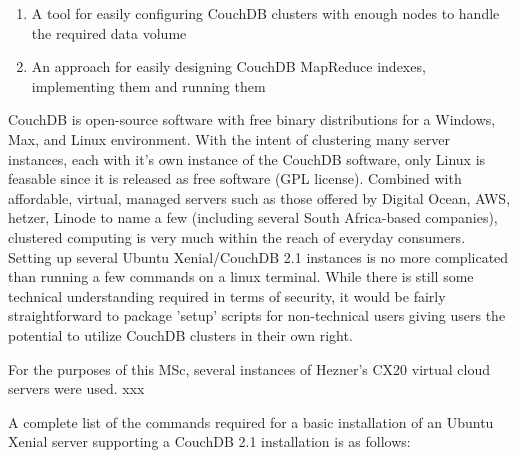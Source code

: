 \begin{enumerate}
    \item A tool for easily configuring CouchDB clusters with enough nodes to handle the required data volume
    \item An approach for easily designing CouchDB MapReduce indexes, implementing them and running them
\end{enumerate}

CouchDB is open-source software with free binary distributions for a Windows, Max, and Linux environment. With the intent of clustering many server instances, each with it's own instance of the CouchDB software, only Linux is feasable since it is released as free software (GPL license). Combined with affordable, virtual, managed servers such as those offered by Digital Ocean, AWS, hetzer, Linode to name a few (including several South Africa-based companies), clustered computing is very much within the reach of everyday consumers. Setting up several Ubuntu Xenial/CouchDB 2.1 instances is no more complicated than running a few commands on a linux terminal. While there is still some technical understanding required in terms of security, it would be fairly straightforward to package 'setup' scripts for non-technical users giving users the potential to utilize CouchDB clusters in their own right.

For the purposes of this MSc, several instances of Hezner's CX20 virtual cloud servers were used. xxx

A complete list of the commands required for a basic installation of an Ubuntu Xenial server supporting a CouchDB 2.1 installation is as follows:

